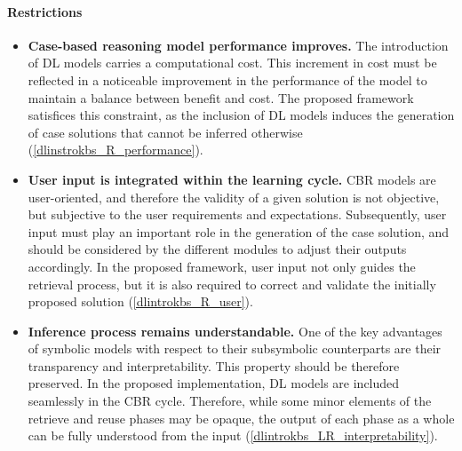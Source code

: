 \paragraph{Restrictions}
\begin{itemize}
    \item \textbf{Case-based reasoning model performance improves.} The introduction of DL models carries a computational cost. This increment in cost must be reflected in a noticeable improvement in the performance of the model to maintain a balance between benefit and cost. The proposed framework satisfices this constraint, as the inclusion of DL models induces the generation of case solutions that cannot be inferred otherwise (\ref{dlinstrokbs_R_performance}).
    
    \item \textbf{User input is integrated within the learning cycle.} CBR models are user-oriented, and therefore the validity of a given solution is not objective, but subjective to the user requirements and expectations. Subsequently, user input must play an important role in the generation of the case solution, and should be considered by the different modules to adjust their outputs accordingly. In the proposed framework, user input not only guides the retrieval process, but it is also required to correct and validate the initially proposed solution (\ref{dlintrokbs_R_user}). 
    
    \item \textbf{Inference process remains understandable.} One of the key advantages of symbolic models with respect to their subsymbolic counterparts are their transparency and interpretability. This property should be therefore preserved. In the proposed implementation, DL models are included seamlessly in the CBR cycle. Therefore, while some minor elements of the retrieve and reuse phases may be opaque, the output of each phase as a whole can be fully understood from the input (\ref{dlintrokbs_LR_interpretability}).
\end{itemize}
